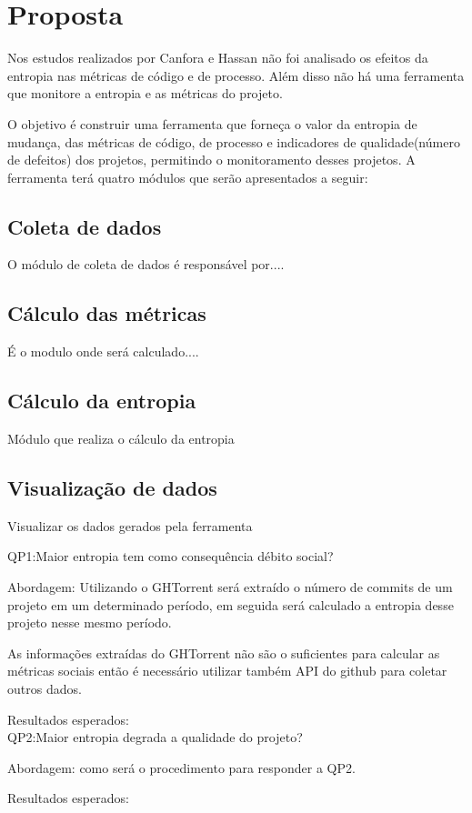 \chapter{Proposta}
Nos estudos realizados por Canfora e Hassan não foi analisado os efeitos da entropia nas métricas de código e de processo. Além disso não há uma ferramenta que monitore a entropia e as métricas do projeto.

O objetivo é construir uma ferramenta que forneça o valor da entropia de mudança, das métricas de código, de processo e indicadores de qualidade(número de defeitos) dos projetos, permitindo o monitoramento desses projetos. A ferramenta terá quatro módulos que serão apresentados a seguir:

\section{Coleta de dados}
O módulo de coleta de dados é responsável por....
\section{Cálculo das métricas}
É o modulo onde será calculado....
\section{Cálculo da entropia}
Módulo que realiza o cálculo da entropia
\section{Visualização de dados}
Visualizar os dados gerados pela ferramenta

QP1:Maior entropia tem como consequência débito social?

Abordagem: Utilizando o GHTorrent será extraído o número de commits de um projeto em um determinado período, em seguida será calculado a entropia desse projeto nesse mesmo período.

As informações extraídas do GHTorrent não são o suficientes para calcular as métricas sociais então é necessário utilizar também API do github para coletar outros dados.

Resultados esperados: \\

QP2:Maior entropia degrada a qualidade do projeto?

Abordagem: como será o procedimento para responder a QP2.

Resultados esperados: 